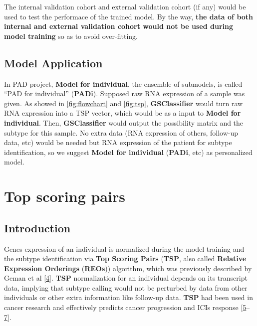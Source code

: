 \documentclass[
  12pt,
]{book}
\begin{document}
The internal validation cohort and external validation cohort (if any) would be used to test the performace of the trained model. By the way, \textbf{the data of both internal and external validation cohort would not be used during model training} so as to avoid over-fitting.

\hypertarget{model-application}{%
\subsection{Model Application}\label{model-application}}

In PAD project, \textbf{Model for individual}, the ensemble of submodels, is called ``PAD for individual'' (\textbf{PADi}). Supposed raw RNA expression of a sample was given. As showed in \ref{fig:flowchart} and \ref{fig:tsp}, \textbf{GSClassifier} would turn raw RNA expression into a TSP vector, which would be as a input to \textbf{Model for individual}. Then, \textbf{GSClassifier} would output the possibility matrix and the subtype for this sample. No extra data (RNA expression of others, follow-up data, etc) would be needed but RNA expression of the patient for subtype identification, so we suggest \textbf{Model for individual} (\textbf{PADi}, etc) as personalized model.

\hypertarget{topicTSP}{%
\section{Top scoring pairs}\label{topicTSP}}

\hypertarget{tsp-intro}{%
\subsection{Introduction}\label{tsp-intro}}

Genes expression of an individual is normalized during the model training and the subtype identification via \textbf{Top Scoring Pairs} (\textbf{TSP}, also called \textbf{Relative Expression Orderings} (\textbf{REOs})) algorithm, which was previously described by Geman et al {[}\protect\hyperlink{ref-RN267}{4}{]}. \textbf{TSP} normalization for an individual depends on its transcript data, implying that subtype calling would not be perturbed by data from other individuals or other extra information like follow-up data. \textbf{TSP} had been used in cancer research and effectively predicts cancer progression and ICIs response {[}\protect\hyperlink{ref-RN265}{5}--\protect\hyperlink{ref-RN261}{7}{]}.
\end{document}
